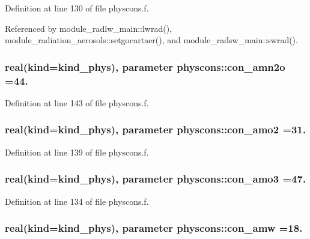 Definition at line 130 of file physcons.\+f.



Referenced by module\+\_\+radlw\+\_\+main\+::lwrad(), module\+\_\+radiation\+\_\+aerosols\+::setgocartaer(), and module\+\_\+radsw\+\_\+main\+::swrad().

\subsubsection[{\texorpdfstring{con\+\_\+amn2o}{con_amn2o}}]{\setlength{\rightskip}{0pt plus 5cm}real(kind=kind\+\_\+phys), parameter physcons\+::con\+\_\+amn2o =44.}\hypertarget{namespacephyscons_abb34f0d5a19aef4a975fb5b1e3141a7b}{}\label{namespacephyscons_abb34f0d5a19aef4a975fb5b1e3141a7b}


Definition at line 143 of file physcons.\+f.

\subsubsection[{\texorpdfstring{con\+\_\+amo2}{con_amo2}}]{\setlength{\rightskip}{0pt plus 5cm}real(kind=kind\+\_\+phys), parameter physcons\+::con\+\_\+amo2 =31.}\hypertarget{namespacephyscons_adffb549f49f2a2160ad3187ef75f60d5}{}\label{namespacephyscons_adffb549f49f2a2160ad3187ef75f60d5}


Definition at line 139 of file physcons.\+f.

\subsubsection[{\texorpdfstring{con\+\_\+amo3}{con_amo3}}]{\setlength{\rightskip}{0pt plus 5cm}real(kind=kind\+\_\+phys), parameter physcons\+::con\+\_\+amo3 =47.}\hypertarget{namespacephyscons_aa2a3f6c3591ab317abdc629b20c3f87f}{}\label{namespacephyscons_aa2a3f6c3591ab317abdc629b20c3f87f}


Definition at line 134 of file physcons.\+f.

\subsubsection[{\texorpdfstring{con\+\_\+amw}{con_amw}}]{\setlength{\rightskip}{0pt plus 5cm}real(kind=kind\+\_\+phys), parameter physcons\+::con\+\_\+amw =18.}\hypertarget{namespacephyscons_afcf5656ae531bc0a656bd079bfe157c3}{}\label{namespacephyscons_afcf5656ae531bc0a656bd079bfe157c3}


